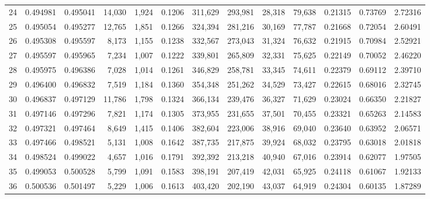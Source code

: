 \begin{tabular}{rrrrrrrrrrrrr}
24 &  0.494981 &  0.495041 &  14,030 &  1,924 &                                     0.1206 &  311,629 &  293,981 &   28,318 &   79,638 &  0.21315 &  0.73769 &  2.72316 \\
25 &  0.495054 &  0.495277 &  12,765 &  1,851 &                                     0.1266 &  324,394 &  281,216 &   30,169 &   77,787 &  0.21668 &  0.72054 &  2.60491 \\
26 &  0.495308 &  0.495597 &   8,173 &  1,155 &                                     0.1238 &  332,567 &  273,043 &   31,324 &   76,632 &  0.21915 &  0.70984 &  2.52921 \\
27 &  0.495597 &  0.495965 &   7,234 &  1,007 &                                     0.1222 &  339,801 &  265,809 &   32,331 &   75,625 &  0.22149 &  0.70052 &  2.46220 \\
28 &  0.495975 &  0.496386 &   7,028 &  1,014 &                                     0.1261 &  346,829 &  258,781 &   33,345 &   74,611 &  0.22379 &  0.69112 &  2.39710 \\
29 &  0.496400 &  0.496832 &   7,519 &  1,184 &                                     0.1360 &  354,348 &  251,262 &   34,529 &   73,427 &  0.22615 &  0.68016 &  2.32745 \\
30 &  0.496837 &  0.497129 &  11,786 &  1,798 &                                     0.1324 &  366,134 &  239,476 &   36,327 &   71,629 &  0.23024 &  0.66350 &  2.21827 \\
31 &  0.497146 &  0.497296 &   7,821 &  1,174 &                                     0.1305 &  373,955 &  231,655 &   37,501 &   70,455 &  0.23321 &  0.65263 &  2.14583 \\
32 &  0.497321 &  0.497464 &   8,649 &  1,415 &                                     0.1406 &  382,604 &  223,006 &   38,916 &   69,040 &  0.23640 &  0.63952 &  2.06571 \\
33 &  0.497466 &  0.498521 &   5,131 &  1,008 &                                     0.1642 &  387,735 &  217,875 &   39,924 &   68,032 &  0.23795 &  0.63018 &  2.01818 \\
34 &  0.498524 &  0.499022 &   4,657 &  1,016 &                                     0.1791 &  392,392 &  213,218 &   40,940 &   67,016 &  0.23914 &  0.62077 &  1.97505 \\
35 &  0.499053 &  0.500528 &   5,799 &  1,091 &                                     0.1583 &  398,191 &  207,419 &   42,031 &   65,925 &  0.24118 &  0.61067 &  1.92133 \\
36 &  0.500536 &  0.501497 &   5,229 &  1,006 &                                     0.1613 &  403,420 &  202,190 &   43,037 &   64,919 &  0.24304 &  0.60135 &  1.87289 \\

\end{tabular}
